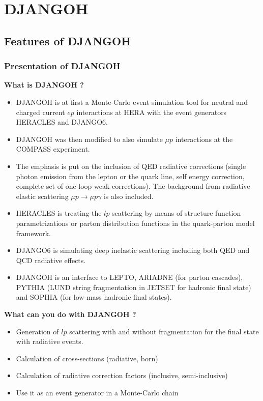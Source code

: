 
\chapter{DJANGOH} %

\label{ch:DJANGOH} %


\section{Features of DJANGOH}

\subsection{Presentation of DJANGOH}
\textbf{What is DJANGOH ?}
\begin{itemize}
\item DJANGOH\cite{DJANGOH} is at first a Monte-Carlo event simulation tool for neutral and charged current
$ep$ interactions at HERA with the event generators HERACLES and DJANGO6.
\item DJANGOH was then modified to also simulate $\mu p$ interactions at the COMPASS experiment.
\item The emphasis is put on the inclusion of QED radiative corrections
(single photon emission from the lepton or the quark line, self energy correction, complete
set of one-loop weak corrections). The background from radiative elastic scattering
$\mu p\rightarrow \mu p\gamma$ is also included.
\item HERACLES is treating the $lp$ scattering by means of structure function parametrizations
or parton distribution functions in the quark-parton model framework.
\item DJANGO6 is simulating deep inelastic scattering including both QED and QCD radiative effects.
\item DJANGOH is an interface to LEPTO\cite{LEPTO}, ARIADNE\cite{ARIADNE} (for parton cascades), PYTHIA\cite{PYTHIA6} (LUND
string fragmentation in JETSET\cite{JETSET} for hadronic final state) and SOPHIA\cite{SOPHIA} (for low-mass
hadronic final states).
\end{itemize}
\textbf{What can you do with DJANGOH ?}
\begin{itemize}
\item Generation of $lp$ scattering with and without fragmentation for the final state with radiative events.
\item Calculation of cross-sections (radiative, born)
\item Calculation of radiative correction factors (inclusive, semi-inclusive)
\item Use it as an event generator in a Monte-Carlo chain
\end{itemize}

